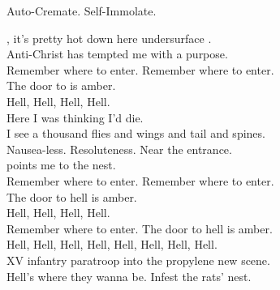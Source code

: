 Auto-Cremate. Self-Immolate. \\




, it's pretty hot down here undersurface . \\
Anti-Christ has tempted me with a purpose. \\

Remember where to enter. Remember where to enter. \\
The door to  is amber. \\

Hell, Hell, Hell, Hell. \\

Here I was thinking I'd die. \\
I see a thousand flies and wings and tail and spines. \\
Nausea-less. Resoluteness. Near the entrance. \\
 points me to the  nest. \\

Remember where to enter. Remember where to enter. \\
The door to hell is amber. \\

Hell, Hell, Hell, Hell. \\

Remember where to enter. The door to hell is amber. \\

Hell, Hell, Hell, Hell, Hell, Hell, Hell, Hell. \\

XV infantry paratroop into the propylene new scene. \\
Hell's where they wanna be. Infest the rats' nest. \\
